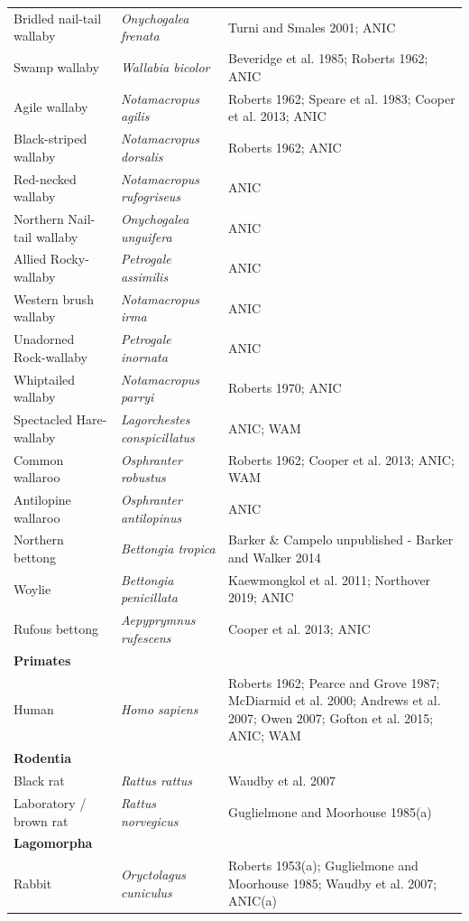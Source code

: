\documentclass[a4paper, nobind]{templates/ociamthesis}
\begin{document}
\begin{longtable}[t]{>{\raggedright\arraybackslash}p{3cm}>{}l>{\raggedright\arraybackslash}p{6cm}}
Bridled nail-tail wallaby & \em{Onychogalea frenata} & Turni and Smales 2001; ANIC\\
Swamp wallaby & \em{Wallabia bicolor} & Beveridge et al. 1985; Roberts 1962; ANIC\\
Agile wallaby & \em{Notamacropus agilis} & Roberts 1962; Speare et al. 1983; Cooper et al. 2013; ANIC\\
Black-striped wallaby & \em{Notamacropus dorsalis} & Roberts 1962; ANIC\\
Red-necked wallaby & \em{Notamacropus rufogriseus} & ANIC\\
Northern Nail-tail wallaby & \em{Onychogalea unguifera} & ANIC\\
Allied Rocky-wallaby & \em{Petrogale assimilis} & ANIC\\
Western brush wallaby & \em{Notamacropus irma} & ANIC\\
Unadorned Rock-wallaby & \em{Petrogale inornata} & ANIC\\
Whiptailed wallaby & \em{Notamacropus parryi} & Roberts 1970; ANIC\\
Spectacled Hare-wallaby & \em{Lagorchestes conspicillatus} & ANIC; WAM\\
Common wallaroo & \em{Osphranter robustus} & Roberts 1962; Cooper et al. 2013;  ANIC; WAM\\
Antilopine wallaroo & \em{Osphranter antilopinus} & ANIC\\
Northern bettong & \em{Bettongia tropica} & Barker \& Campelo unpublished - Barker and Walker 2014\\
Woylie & \em{Bettongia penicillata} & Kaewmongkol et al. 2011; Northover 2019; ANIC\\
Rufous bettong & \em{Aepyprymnus rufescens} & Cooper et al. 2013; ANIC\\
\textbf{Primates} & \em{\textbf{}} & \textbf{}\\
Human & \em{Homo sapiens} & Roberts 1962; Pearce and Grove 1987; McDiarmid et al. 2000; Andrews et al. 2007; Owen 2007; Gofton et al. 2015; ANIC; WAM\\
\textbf{Rodentia} & \em{\textbf{}} & \textbf{}\\
Black rat & \em{Rattus rattus} & Waudby et al. 2007\\
Laboratory / brown rat & \em{Rattus norvegicus} & Guglielmone and Moorhouse 1985(a)\\
\textbf{Lagomorpha} & \em{\textbf{}} & \textbf{}\\
Rabbit & \em{Oryctolagus cuniculus} & Roberts 1953(a); Guglielmone and Moorhouse 1985; Waudby et al. 2007; ANIC(a)\\

\end{longtable}
\end{document}
